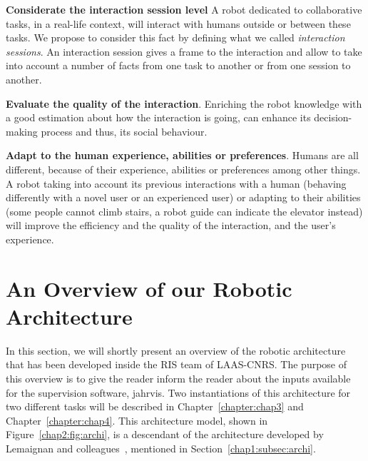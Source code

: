 \documentclass[a4paper,11pt,twoside]{StyleThese}
\begin{document}
\begin{bulletList}
	\item \textbf{Considerate the interaction session level} A robot dedicated to collaborative tasks, in a real-life context, will interact with humans outside or between these tasks. We propose to consider this fact by defining what we called \textit{interaction sessions}. An interaction session gives a frame to the interaction and allow to take into account a number of facts from one task to another or from one session to another.
	\item \textbf{Evaluate the quality of the interaction}. Enriching the robot knowledge with a good estimation about how the interaction is going, can enhance its decision-making process and thus, its social behaviour.
	\item \textbf{Adapt to the human experience, abilities or preferences}. Humans are all different, because of their experience, abilities or preferences among other things. A robot taking into account its previous interactions with a human (\eg behaving differently with a novel user or an experienced user) or adapting to their abilities (\eg some people cannot climb stairs, a robot guide can indicate the elevator instead) will improve the efficiency and the quality of the interaction, and the user's experience.
\end{bulletList}


\section{An Overview of our Robotic Architecture}\label{chap2:sec:rob_archi}

In this section, we will shortly present an overview of the robotic architecture that has been developed inside the RIS team of LAAS-CNRS. The purpose of this overview is to give the reader inform the reader about the inputs available for the supervision software, \acrshort{jahrvis}. Two instantiations of this architecture for two different tasks will be described in Chapter~\ref{chapter:chap3} and Chapter~\ref{chapter:chap4}. This architecture model, shown in Figure~\ref{chap2:fig:archi}, is a descendant of the architecture developed by Lemaignan and colleagues~\cite{lemaignan_2017_artificial}, mentioned in Section~\ref{chap1:subsec:archi}. 
\end{document}

